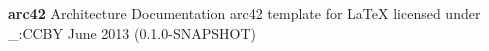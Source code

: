 
\begin{titlepage}
\sffamily
\begin{center}
{\LARGE\bfseries arc42}
\vskip 1cm
{\large Architecture Documentation}
\vskip 1cm
{\large arc42\autocite{ARC42} template for \LaTeX{}}
\vfill
licensed under \gls{_:CCBY}
\vskip 0.5cm
June 2013 (0.1.0-SNAPSHOT)
\end{center}
\end{titlepage}
